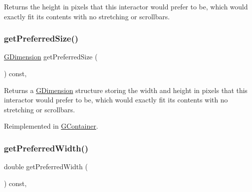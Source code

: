 Returns the height in pixels that this interactor would prefer to be, which would exactly fit its contents with no stretching or scrollbars. 

\mbox{\label{classsgl_1_1GInteractor_a4aabbee761d8e9116275401131b7ccd1}} 
\subsubsection{\texorpdfstring{get\+Preferred\+Size()}{getPreferredSize()}}
{\footnotesize\ttfamily \mbox{\hyperlink{structsgl_1_1GDimension}{G\+Dimension}} get\+Preferred\+Size (\begin{DoxyParamCaption}{ }\end{DoxyParamCaption}) const\hspace{0.3cm}{\ttfamily [virtual]}, {\ttfamily [inherited]}}



Returns a \mbox{\hyperlink{structsgl_1_1GDimension}{G\+Dimension}} structure storing the width and height in pixels that this interactor would prefer to be, which would exactly fit its contents with no stretching or scrollbars. 



Reimplemented in \mbox{\hyperlink{classsgl_1_1GContainer_ac0fd6fc35681f935c67ad68078b354b8}{G\+Container}}.

\mbox{\label{classsgl_1_1GInteractor_a82bca31d37700fb0e35d2743352efd5e}} 
\subsubsection{\texorpdfstring{get\+Preferred\+Width()}{getPreferredWidth()}}
{\footnotesize\ttfamily double get\+Preferred\+Width (\begin{DoxyParamCaption}{ }\end{DoxyParamCaption}) const\hspace{0.3cm}{\ttfamily [virtual]}, {\ttfamily [inherited]}}



